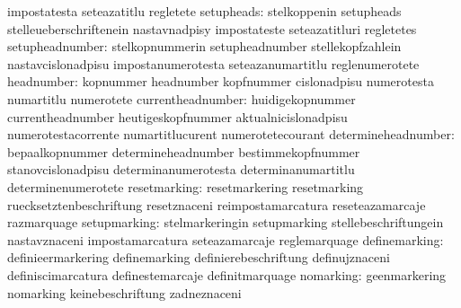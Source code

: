                                   impostatesta                     seteazatitlu
                                  regletete
                      setupheads: stelkoppenin                     setupheads
                                  stelleueberschriftenein          nastavnadpisy
                                  impostateste                     seteazatitluri
                                  regletetes
                 setupheadnumber: stelkopnummerin                  setupheadnumber
                                  stellekopfzahlein                nastavcislonadpisu
                                  impostanumerotesta               seteazanumartitlu
                                  reglenumerotete
                      headnumber: kopnummer                        headnumber
                                  kopfnummer                       cislonadpisu
                                  numerotesta                      numartitlu
                                  numerotete
               currentheadnumber: huidigekopnummer                 currentheadnumber
                                  heutigeskopfnummer               aktualnicislonadpisu
                                  numerotestacorrente              numartitlucurent
                                  numerotetecourant
             determineheadnumber: bepaalkopnummer                  determineheadnumber
                                  bestimmekopfnummer               stanovcislonadpisu
                                  determinanumerotesta             determinanumartitlu
                                  determinenumerotete
                    resetmarking: resetmarkering                   resetmarking
                                  ruecksetztenbeschriftung         resetznaceni
                                  reimpostamarcatura               reseteazamarcaje
                                  razmarquage
                    setupmarking: stelmarkeringin                  setupmarking
                                  stellebeschriftungein            nastavznaceni
                                  impostamarcatura                 seteazamarcaje
                                  reglemarquage
                   definemarking: definieermarkering               definemarking
                                  definierebeschriftung            definujznaceni
                                  definiscimarcatura               definestemarcaje
                                  definitmarquage
                       nomarking: geenmarkering                    nomarking
                                  keinebeschriftung                zadneznaceni
